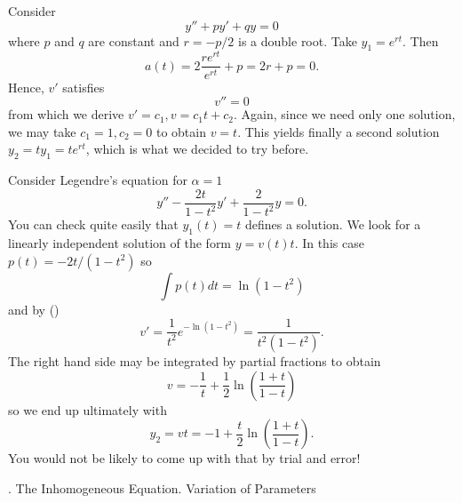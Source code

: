 \nextex
{}  Consider
$$
y'' + py' + qy = 0
$$
where $p$ and $q$ are constant and $r = -p/2$ is a double
root.  Take $y_1 = e^{rt}$.   Then
$$
a(t) = 2\frac{re^{rt}}{e^{rt}} + p = 2r + p = 0.
$$
Hence, $v'$ satisfies
$$
v'' = 0
$$
from which we derive $v' = c_1, v = c_1t + c_2$.  Again, since
we need only one solution, we may take $c_1 = 1, c_2 = 0$ to
obtain $v = t$.  This yields finally a second solution
$y_2 = ty_1 = te^{rt}$, which is what we decided to try before.
\endexample

\nextex
{}  Consider Legendre's equation
for $\alpha = 1$
$$
y'' - \frac{2t}{1 - t^2}y' + \frac 2{1 - t^2}y = 0.
$$
You can check quite easily that $y_1(t) = t$ defines
a solution.   We look for a linearly independent solution
of the form $y = v(t)t$.  In this case $p(t) = -2t/(1 - t^2)$
so 
$$
\int p(t) dt = \ln (1 - t^2)
$$
and by (\eqn)
$$
v' = \frac 1{t^2}e^{-\ln(1 - t^2)} = \frac 1{t^2(1 - t^2)}.
$$
The right hand side may be integrated by partial fractions to obtain
$$
v = -\frac 1t + \frac 12\ln\left(\frac{1+t}{1-t}\right)
$$
so we end up ultimately with
$$
y_2 = vt =  -1 +  \frac t2\ln\left(\frac{1+t}{1-t}\right).
$$
You would not be likely to come up with that by trial and error!
\endexample
\bigskip

\bigskip

\head \sn.  The Inhomogeneous Equation. Variation of Parameters \endhead


